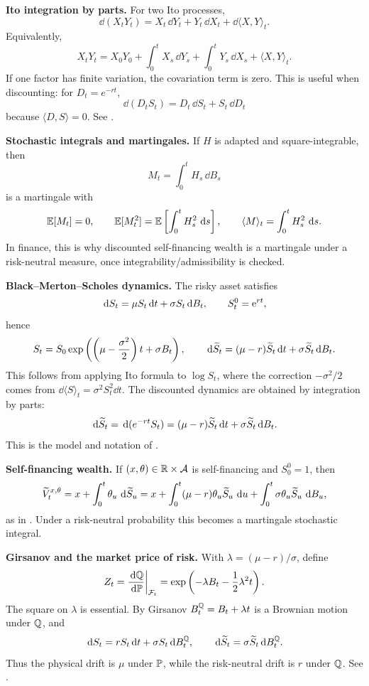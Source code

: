 \begin{techniques}
  \item \textbf{Ito integration by parts.}
  For two Ito processes,
  \[
    \dd(X_tY_t)=X_t\,\dd Y_t+Y_t\,\dd X_t+\dd\langle X,Y\rangle_t.
  \]
  Equivalently,
  \[
    X_tY_t=X_0Y_0+\int_0^tX_s\,\dd Y_s
      +\int_0^tY_s\,\dd X_s+\langle X,Y\rangle_t.
  \]
  If one factor has finite variation, the covariation term is zero.  This is
  useful when discounting: for \(D_t=e^{-rt}\),
  \[
    \dd(D_tS_t)=D_t\,\dd S_t+S_t\,\dd D_t
  \]
  because \(\langle D,S\rangle=0\).  See .

  \item \textbf{Stochastic integrals and martingales.}
  If \(H\) is adapted and square-integrable, then
  \[
    M_t=\int_0^tH_s\,\dd B_s
  \]
  is a martingale with
  \[
    \E[M_t]=0,\qquad
    \E[M_t^2]=\E\left[\int_0^tH_s^2\,\dd s\right],
    \qquad
    \langle M\rangle_t=\int_0^tH_s^2\,\dd s.
  \]
  In finance, this is why discounted self-financing wealth is a martingale
  under a risk-neutral measure, once integrability/admissibility is checked.

  \item \textbf{Black--Merton--Scholes dynamics.}
  The risky asset satisfies
  \[
    \dd S_t=\mu S_t\dd t+\sigma S_t\dd B_t,\qquad S^0_t=\e^{rt},
  \]
  hence
  \[
    S_t=S_0\exp\left(\left(\mu-\frac{\sigma^2}{2}\right)t+\sigma B_t\right),
    \qquad
    \dd \Stilde_t=(\mu-r)\Stilde_t\dd t+\sigma \Stilde_t\dd B_t.
  \]
  This follows from applying Ito formula to \(\log S_t\), where the
  correction \(-\sigma^2/2\) comes from
  \(\dd\langle S\rangle_t=\sigma^2S_t^2\dd t\).  The discounted dynamics are
  obtained by integration by parts:
  \[
    \dd \Stilde_t
      =\dd(e^{-rt}S_t)
      =(\mu-r)\Stilde_t\dd t+\sigma\Stilde_t\dd B_t.
  \]
  This is the model and notation of .

  \item \textbf{Self-financing wealth.}
  If \((x,\theta)\in\R\times\A\) is self-financing and \(S^0_0=1\), then
  \[
    \Vtilde_t^{x,\theta}
      =x+\int_0^t\theta_u\,\dd\Stilde_u
      =x+\int_0^t(\mu-r)\theta_u\Stilde_u\,\dd u
        +\int_0^t\sigma\theta_u\Stilde_u\,\dd B_u,
  \]
  as in .  Under a risk-neutral probability this becomes a
  martingale stochastic integral.

  \item \textbf{Girsanov and the market price of risk.}
  With \(\lambda=(\mu-r)/\sigma\), define
  \[
    Z_t=\frac{\dd\Q}{\dd\P}\bigg|_{\F_t}
      =\exp\left(-\lambda B_t-\frac{1}{2}\lambda^2t\right).
  \]
  The square on \(\lambda\) is essential.  By Girsanov
  \(B_t^\Q=B_t+\lambda t\) is a Brownian motion under \(\Q\), and
  \[
    \dd S_t=rS_t\dd t+\sigma S_t\dd B_t^\Q,\qquad
    \dd\Stilde_t=\sigma\Stilde_t\dd B_t^\Q.
  \]
  Thus the physical drift is \(\mu\) under \(\P\), while the risk-neutral drift
  is \(r\) under \(\Q\).  See .


\end{techniques}
